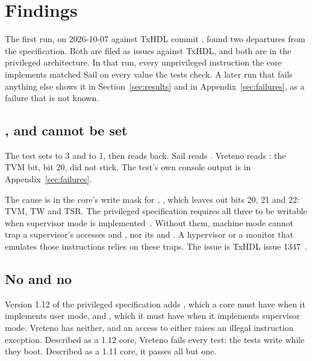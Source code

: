 \section{Findings}
\label{sec:findings}

The first run, on 2026-10-07 against TxHDL commit ,
found two departures from the specification. Both are filed as issues
against TxHDL, and both are in the privileged architecture. In that
run, every unprivileged instruction the core implements matched Sail
on every value the tests check. A later run that fails anything else
shows it in Section~\ref{sec:results} and in
Appendix~\ref{sec:failures}, as a failure that is not known.

\subsection{,  and  cannot be set}

The test  sets 
to 3 and  to 1, then reads  back. Sail
reads . Vreteno reads : the TVM bit,
bit 20, did not stick. The test's own console output is in
Appendix~\ref{sec:failures}.

The cause is in the core's write mask for ,
, which leaves out bits 20, 21 and 22:
TVM, TW and TSR. The privileged specification requires all three to be
writable when supervisor mode is implemented~\cite{priv}. Without them,
machine mode cannot trap a supervisor's  accesses and
, nor its  and . A hypervisor or
a monitor that emulates those instructions relies on these traps.
The issue is TxHDL issue 1347~\cite{issue1347}.

\subsection{No  and no }

Version 1.12 of the privileged specification adds , which
a core must have when it implements user mode, and ,
which it must have when it implements supervisor mode. Vreteno has
neither, and an access to either raises an illegal instruction
exception. Described as a 1.12 core, Vreteno fails every test: the
tests write  while they boot. Described as a 1.11 core,
it passes all but one.

